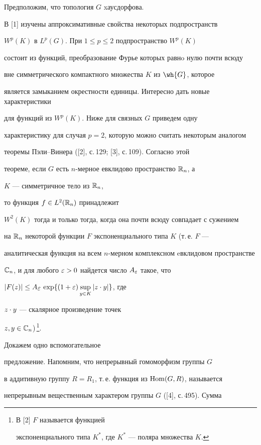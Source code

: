 Предположим, что топология $G$ xаусдорфова.


В [1] изучены аппроксимативные свойства некоторых подпространств 


$W^p(K)$ в $L^p(G)$. При $1\le p\le2$ подпространство $W^p(K)$


состоит из функций, преобразование Фурье которых равнo нулю почти всюду 


вне симметрического компактного множества $K$ из $\wh{G}$, которое 


является замыканием окрестности единицы. Интересно дать новые характеристики 


для функций из $W^p(K)$. Ниже для связных $G$ приведем одну 


характеристику для случая $p=2$, которую можно считать некоторым аналогом 


теоремы Пэли--Винера ([2], с.\,129; [3], с.\,109). Согласно этой 


теореме, если $G$ есть $n$-мерное евклидово пространство $\Bbb R_n$, а 


$K$ --- симметричное тело из $\Bbb R_n$,


то функция $f\in L^2(\Bbb R_n)$ принадлежит 


$W^2(K)$ тогда и только тогда, когда она почти всюду совпадает с сужением


на $\Bbb R_n$ некоторой функции $F$ экспоненциального типа $K$ (т.\,е. $F$ --- 


аналитическая функция на всем $n$-мерном комплексном eвклидовом пространстве 


$\Bbb C_n$, и для любого $\varepsilon>0$ найдется число $A_\varepsilon$ такое, что 


$|F(z)|\le A_{\displaystyle{\varepsilon}}\,\exp\{(1+\varepsilon)\sup\limits_{y\in K}|z\cdot y|\}$, где 


$z\cdot y$ --- скалярное произведение точек


$z,y\in \Bbb C_n$)\,\footnote{В [2] $F$ называется функцией


экспоненциального типа $K^*$, где $K^*$ --- поляра множества $K$.}.





Докажем одно вспомогательное 


предложение. Напомним, что непрерывный гомоморфизм группы $G$ 


в аддитивную группу $R=R_1$, т.\,е. функция из $\operatorname{Hom}(G,R)$, называется


непрерывным вещественным характером группы $G$ ([4], с.\,495). Сумма 


